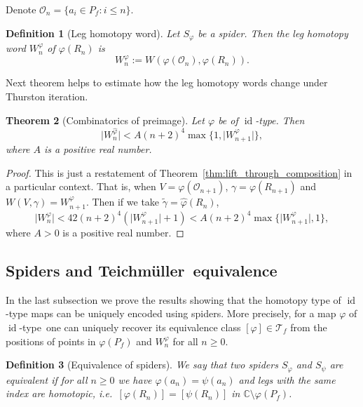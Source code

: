 \documentclass[10pt,reqno,a4paper]{amsart}
\numberwithin{figure}{section}
\numberwithin{equation}{section}
\newtheorem{thm}{Theorem}[section]
\newtheorem{defn}[thm]{Definition}
\newcommand{\tei}{Teichm\"uller}
\newcommand{\idt}{of $\id$-type}
\newcommand{\id}{\operatorname{id}}
\newcommand{\abs}[1]{\lvert #1 \rvert}
\begin{document}
Denote $\mathcal{O}_n=\{a_i\in P_f:i\leq n\}$.

\begin{defn}[Leg homotopy word]
	Let $S_\varphi$ be a spider. Then the \emph{leg homotopy word} $W_n^\varphi$ of $\varphi(R_n)$ is 
	$$W_n^\varphi:=W(\varphi(\mathcal{O}_n),\varphi(R_n)).$$
\end{defn}

Next theorem helps to estimate how the leg homotopy words change under Thurston iteration.

\begin{thm}[Combinatorics of preimage]
	\label{thm:homotopy_type_under_pullback}
	Let $\varphi$ be \idt. Then $$\abs{W_n^{\hat{\varphi}}}<A(n+2)^4 \max\{1,\abs{W_{n+1}^\varphi}\},$$ where $A$ is a positive real number.
\end{thm}
\begin{proof}
	This is just a restatement of Theorem~\ref{thm:lift_through_composition} in a particular context. That is, when $V=\varphi(\mathcal{O}_{n+1})$, $\gamma=\varphi(R_{n+1})$ and $W(V,\gamma)=W_{n+1}^\varphi$. Then if we take $\tilde{\gamma}=\hat{\varphi}(R_n)$,
	$$\abs{W_n^{\hat{\varphi}}}<42(n+2)^4 (\abs{W_{n+1}^\varphi}+1)<A(n+2)^4\max\{\abs{W_{n+1}^\varphi},1\},$$
	where $A>0$ is a positive real number.
\end{proof}

\subsection{Spiders and \tei\ equivalence}

In the last subsection we prove the results showing that the homotopy type of $\id$-type maps can be uniquely encoded using spiders. More precisely, for a map $\varphi$ \idt\ one can uniquely recover its equivalence class $[\varphi]\in\mathcal{T}_f$ from the positions of points in $\varphi(P_f)$ and $W_n^\varphi$ for all $n\geq 0$. 

\begin{defn}[Equivalence of spiders]
	We say that two spiders $S_\varphi$ and $S_\psi$ are \emph{equivalent} if for all $n\geq 0$ we have $\varphi(a_{n})=\psi(a_{n})$ and legs with the same index are homotopic, i.e.\ $[\varphi(R_{n})]=[\psi(R_{n})]$ in $\mathbb{C}\setminus \varphi(P_f)$.
\end{defn}
\end{document}
